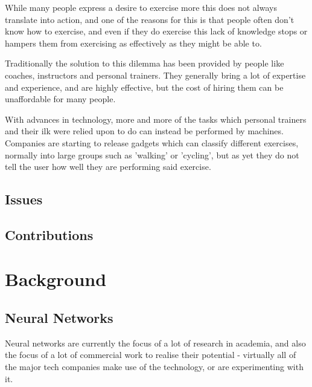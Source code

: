 \documentclass[a4paper]{article}
\begin{document}
While many people express a desire to exercise more this does not always translate into action, and one of the reasons for this is that
people often don't know how to exercise, and even if they do exercise this lack of knowledge stops or hampers them from exercising as effectively as they might be able to.

Traditionally the solution to this dilemma has been provided by people like coaches, instructors and personal trainers. They generally bring a lot of expertise and experience, and are highly effective, but the cost of hiring them can be unaffordable for many people.

With advances in technology, more and more of the tasks which personal trainers and their ilk were relied upon to do can instead be performed by machines. Companies are starting to release gadgets which can classify different exercises, normally into large groups such as 'walking' or 'cycling', but as yet they do not tell the user how well they are performing said exercise.

\subsection{Issues}%


\subsection{Contributions}%


\newpage
\section{Background}

\subsection{Neural Networks}%

Neural networks are currently the focus of a lot of research in academia, and also the focus of a lot of commercial work to realise their potential - virtually all of the major tech companies make use of the technology, or are experimenting with it.
\end{document}
